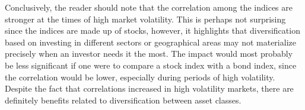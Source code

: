 Conclusively, the reader should note that the correlation among the indices are stronger at the times of high market volatility. This is perhaps not surprising since the indices are made up of stocks, however, it highlights that diversification based on investing in different sectors or geographical areas may not materialize precisely when an investor needs it the most. The impact would most probably be less significant if one were to compare a stock index with a bond index, since the correlation would be lower, especially during periods of high volatility. Despite the fact that correlations increased in high volatility markets, there are definitely benefits related to diversification between asset classes.